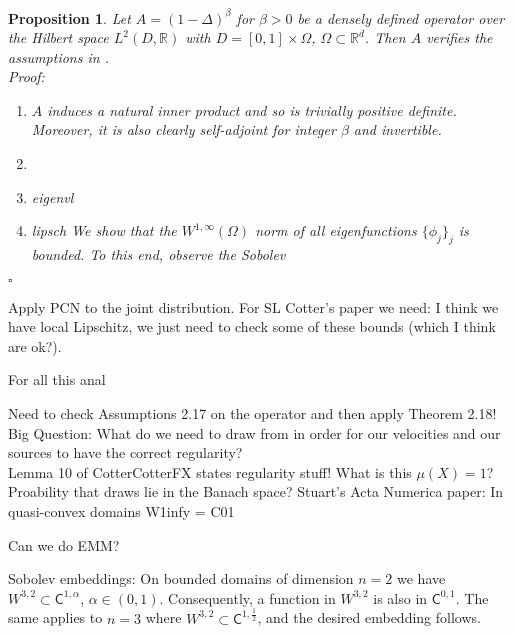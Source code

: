 \documentclass{article}
\newtheorem{proposition}{Proposition}
\begin{document}
\begin{proposition}\label{prop:verify_assump2.17}
Let $A = (1-\Delta)^\beta$ for $\beta>0$ be a densely defined operator over the
Hilbert space $L^2(D, \mathbb{R})$ with $D = [0,1] \times \Omega$, $\Omega
\subset \mathbb{R}^d$. Then $A$ verifies the assumptions in \cite[Assumption
2.17]{dashti2017bayesian}.\\

Proof:\\

\begin{enumerate}
\item $A$ induces a natural inner product and so is trivially positive definite.
Moreover, it is also clearly self-adjoint for integer $\beta$ and invertible.
\item 
\item eigenvl
\item lipsch
We show that the $W^{1,\infty}(\Omega)$ norm of all eigenfunctions
$\{\phi_j\}_j$ is bounded. To this end, observe the Sobolev
\end{enumerate}

{\hfill $\square$}
\end{proposition}

Apply PCN to the joint distribution.
For SL Cotter's  paper we need: I think we have local Lipschitz, we just need to
check some of these bounds (which I think are ok?).

For all this anal

Need to check Assumptions 2.17 on the operator and then apply Theorem 2.18!\\


Big Question: What do we need to draw from in order for our velocities and
our sources to have the correct regularity?\\

Lemma 10 of CotterCotterFX states regularity stuff!
What is this $\mu(X) = 1$? Proability that draws lie in the Banach space?
Stuart's Acta Numerica paper:
In quasi-convex domains W1infy = C01



Can we do EMM?


Sobolev embeddings: On bounded domains of dimension $n=2$ we have
$W^{3,2}\subset \mathsf{C}^{1,\alpha}$, $\alpha\in (0,1)$. Consequently, a
function in $W^{3,2}$ is also in $\mathsf{C}^{0,1}$. The same applies to $n=3$
where $W^{3,2}\subset \mathsf{C}^{1,\frac 12}$, and the desired embedding
follows.\\
\end{document}
